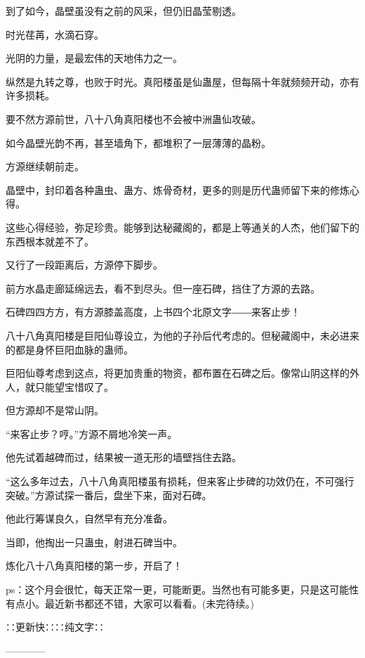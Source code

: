 \begin{this_body}
到了如今，晶壁虽没有之前的风采，但仍旧晶莹剔透。

时光荏苒，水滴石穿。

光阴的力量，是最宏伟的天地伟力之一。

纵然是九转之尊，也败于时光。真阳楼虽是仙蛊屋，但每隔十年就频频开动，亦有许多损耗。

要不然方源前世，八十八角真阳楼也不会被中洲蛊仙攻破。

如今晶壁光韵不再，甚至墙角下，都堆积了一层薄薄的晶粉。

方源继续朝前走。

晶壁中，封印着各种蛊虫、蛊方、炼骨奇材，更多的则是历代蛊师留下来的修炼心得。

这些心得经验，弥足珍贵。能够到达秘藏阁的，都是上等通关的人杰，他们留下的东西根本就差不了。

又行了一段距离后，方源停下脚步。

前方水晶走廊延绵远去，看不到尽头。但一座石碑，挡住了方源的去路。

石碑四四方方，有方源膝盖高度，上书四个北原文字――来客止步！

八十八角真阳楼是巨阳仙尊设立，为他的子孙后代考虑的。但秘藏阁中，未必进来的都是身怀巨阳血脉的蛊师。

巨阳仙尊考虑到这点，将更加贵重的物资，都布置在石碑之后。像常山阴这样的外人，就只能望宝惜叹了。

但方源却不是常山阴。

“来客止步？哼。”方源不屑地冷笑一声。

他先试着越碑而过，结果被一道无形的墙壁挡住去路。

“这么多年过去，八十八角真阳楼虽有损耗，但来客止步碑的功效仍在，不可强行突破。”方源试探一番后，盘坐下来，面对石碑。

他此行筹谋良久，自然早有充分准备。

当即，他掏出一只蛊虫，射进石碑当中。

炼化八十八角真阳楼的第一步，开启了！

ps：这个月会很忙，每天正常一更，可能断更。当然也有可能多更，只是这可能性有点小。最近新书都还不错，大家可以看看。(未完待续。)

∷更新快∷∷纯文字∷

------------

\end{this_body}


